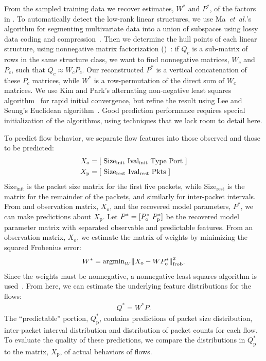 \documentclass{acm_proc_article-sp}
\begin{document}
From the sampled training data we recover estimates, $W^*$ and $P^*$, of the factors in .
To automatically detect the low-rank linear structures, we use Ma~\emph{et~al.}'s algorithm for segmenting multivariate data into a union of subspaces using lossy data coding and compression~\cite{Ma07}.
Then we determine the hull points of each linear structure, using nonnegative matrix factorization ()~\cite{Lee01}:
if $Q_c$ is a sub-matrix of rows in the same structure class, we want to find nonnegative matrices, $W_c$ and $P_c$, such that $Q_c \approx W_c P_c$.
Our reconstructed $P^*$ is a vertical concatenation of these $P_c$ matrices, while $W^*$ is a row-permutation of the direct sum of $W_c$ matrices.
We use Kim and Park's alternating non-negative least squares algorithm~\cite{Kim08:anls} for rapid initial convergence, but refine the result using Lee and Seung's Euclidean algorithm~\cite{Lee01}.
Good prediction performance requires special initialization of the  algorithms, using techniques that we lack room to detail here.

To predict flow behavior, we separate flow features into those observed and those to be predicted:
\begin{align}
  X_\text{o} &= {\left[ ~
    \text{Size}_\text{init} ~
    \text{Ival}_\text{init} ~
    \text{Type} ~
    \text{Port} ~
  \right]} \\
  X_\text{p} &= {\left[ ~
    \text{Size}_\text{rest} ~
    \text{Ival}_\text{rest} ~
    \text{Pkts} ~
  \right]}
\end{align}
$\text{Size}_\text{init}$ is the packet size matrix for the first five packets, while $\text{Size}_\text{rest}$ is the matrix for the remainder of the packets, and similarly for inter-packet intervals.
From and observation matrix, $X_\text{o}$, and the recovered model parameters, $P^*$, we can make predictions about $X_\text{p}$.
Let $P^* = {[P^*_\text{o}~P^*_\text{p}]}$ be the recovered model parameter matrix  with separated observable and predictable features.
From an observation matrix, $X_\text{o}$, we estimate the matrix of weights by minimizing the squared Frobenius error:
\begin{align}
  W^* = \text{argmin}_W {{\left\lVert X_\text{o} - W P^*_\text{o}\right\rVert}^2_\text{frob}}.
\end{align}
Since the weights must be nonnegative, a nonnegative least squares algorithm is used~\cite{Benthem04,Kim08:block-pivot}.
From here, we can estimate the underlying feature distributions for the flows:
\begin{align}
  Q^* = W^*P.
\end{align}
The ``predictable'' portion, $Q^*_\text{p}$, contains predictions of packet size distribution, inter-packet interval distribution and distribution of packet counts for each flow.
To evaluate the quality of these predictions, we compare the distributions in $Q^*_\text{p}$ to the matrix, $X_\text{p}$, of actual behaviors of flows.
\end{document}

